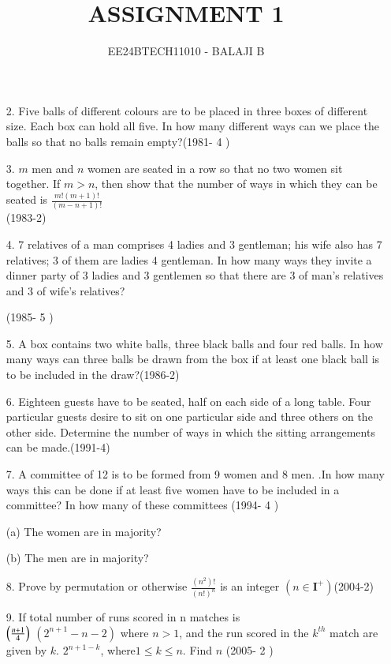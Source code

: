 \documentclass[journal,12pt,twocolumn]{IEEEtran}
\theoremstyle{remark}
\begin{document}

\vspace{3cm}

\title{ASSIGNMENT 1}
\author{EE24BTECH11010 - BALAJI B}
\maketitle
\newpage
\bigskip

\renewcommand{\thefigure}{\theenumi}
\renewcommand{\thetable}{\theenumi}
\begin{enumerate}
    \item[2.]   Five balls of different colours are to be placed in three boxes of different size. Each box can hold all five. In how many different ways can we place the balls so that no balls remain empty?\hfill (1981- 4 )
    \item[3.] $m$ men and $n$ women are seated in a row so that no two women sit together. If $m>n$, then show that the number of ways in which they can be seated is $\frac{m!(m+1)!}{(m-n+1)!}$ \\

    \hfill (1983-2)
    \item[4.] 7 relatives of a man comprises 4 ladies and 3 gentleman; his wife also has 7 relatives; 3 of them are ladies 4 gentleman. In how many ways they invite a dinner party of 3 ladies and 3 gentlemen so that there are 3 of man's relatives and 3 of wife's relatives?
    
    \hfill (1985- 5 )
    \item[5.]A box contains two white balls, three black balls and four red balls. In how many ways can three balls be drawn from the box if at least one black ball is to be included in the draw?\hfill (1986-2)
    \item[6. ] Eighteen guests have to be seated, half on each side of a long table. Four particular guests desire to sit on one particular side and three others on the other side. Determine the number of ways in which the sitting arrangements can be made.\hfill (1991-4)
    \item[7.]A committee of 12 is to be formed from 9 women and 8 men. .In how many ways this can be done if at least five women have to be included in a committee? In how many of these committees \hfill (1994- 4 )

    (a)  The women are in majority?
    
    (b)  The men are in majority?
    
    \item[8. ] Prove by permutation or otherwise $\frac{(n^2)!}{(n!)^n}$ is an integer $(n\in \mathbf{I}^+) $\hfill (2004-2)
     \item[9. ] If total number of runs scored in n matches is\\
     
     $\left(\frac{n+1}{4}\right)$  $(2^{n+1}-n-2)$ where $n>1$, and the run scored in the $k^{th}$ match are given by $k$. $2^{n+1-k}$, where$ 1 \leq k \leq n$. Find $n$ \hfill (2005- 2 )
     
    \end{enumerate}
\end{document}
